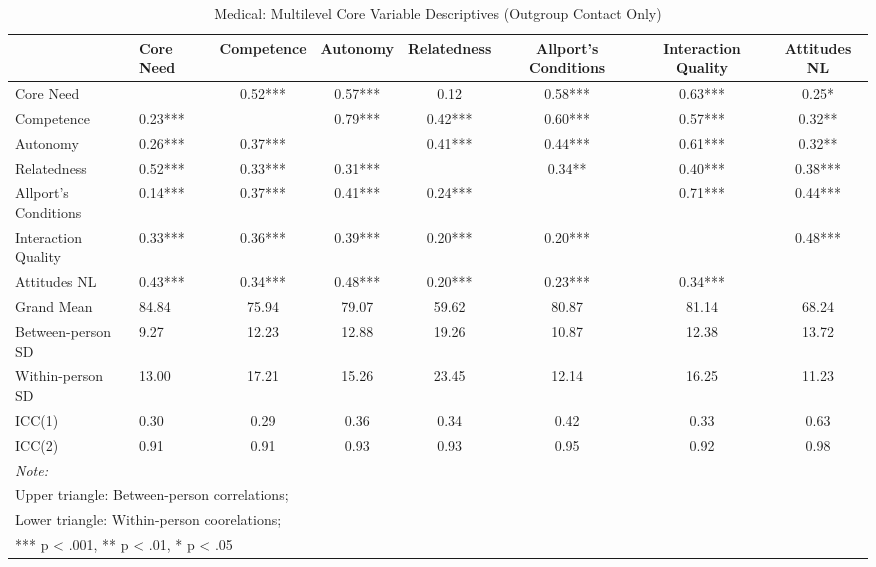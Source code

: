 \begin{table}
\begin{minipage}[t][\textheight][t]{\textwidth}

\caption{Medical: Multilevel Core Variable Descriptives (Outgroup Contact Only)}
\centering
\begin{tabular}[t]{llcccccc}
\toprule
  & Core Need & Competence & Autonomy & Relatedness & Allport's Conditions & Interaction Quality & Attitudes NL\\
\midrule
Core Need &  & 0.52*** & 0.57*** & 0.12 & 0.58*** & 0.63*** & 0.25*\\
Competence & 0.23*** &  & 0.79*** & 0.42*** & 0.60*** & 0.57*** & 0.32**\\
Autonomy & 0.26*** & 0.37*** &  & 0.41*** & 0.44*** & 0.61*** & 0.32**\\
Relatedness & 0.52*** & 0.33*** & 0.31*** &  & 0.34** & 0.40*** & 0.38***\\
Allport's Conditions & 0.14*** & 0.37*** & 0.41*** & 0.24*** &  & 0.71*** & 0.44***\\
\addlinespace
Interaction Quality & 0.33*** & 0.36*** & 0.39*** & 0.20*** & 0.20*** &  & 0.48***\\
Attitudes NL & 0.43*** & 0.34*** & 0.48*** & 0.20*** & 0.23*** & 0.34*** & \\
Grand Mean & 84.84 & 75.94 & 79.07 & 59.62 & 80.87 & 81.14 & 68.24\\
Between-person SD & 9.27 & 12.23 & 12.88 & 19.26 & 10.87 & 12.38 & 13.72\\
Within-person SD & 13.00 & 17.21 & 15.26 & 23.45 & 12.14 & 16.25 & 11.23\\
\addlinespace
ICC(1) & 0.30 & 0.29 & 0.36 & 0.34 & 0.42 & 0.33 & 0.63\\
ICC(2) & 0.91 & 0.91 & 0.93 & 0.93 & 0.95 & 0.92 & 0.98\\
\bottomrule
\multicolumn{8}{l}{\rule{0pt}{1em}\textit{Note: }}\\
\multicolumn{8}{l}{\rule{0pt}{1em}Upper triangle: Between-person correlations;}\\
\multicolumn{8}{l}{\rule{0pt}{1em}Lower triangle: Within-person coorelations;}\\
\multicolumn{8}{l}{\rule{0pt}{1em}*** p < .001, ** p < .01,  * p < .05}\\
\end{tabular}
\end{minipage}
\end{table}
